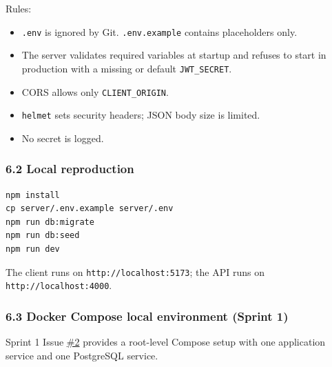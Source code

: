 \documentclass[12pt,a4paper]{article}
\begin{document}
Rules:

\begin{itemize}[leftmargin=*]
\item \texttt{.env} is ignored by Git. \texttt{.env.example} contains placeholders only.
\item The server validates required variables at startup and refuses to start in production with a missing or default \texttt{JWT\_SECRET}.
\item CORS allows only \texttt{CLIENT\_ORIGIN}.
\item \texttt{helmet} sets security headers; JSON body size is limited.
\item No secret is logged.
\end{itemize}

\subsubsection*{6.2 Local reproduction}
\begin{lstlisting}
npm install
cp server/.env.example server/.env
npm run db:migrate
npm run db:seed
npm run dev
\end{lstlisting}

The client runs on \texttt{http://localhost:5173}; the API runs on \texttt{http://localhost:4000}.

\subsubsection*{6.3 Docker Compose local environment (Sprint 1)}
Sprint 1 Issue \href{https://github.com/Snnn3/SurveyHub/issues/2}{\#2} provides a root-level Compose setup with one application service and one PostgreSQL service.
\end{document}
